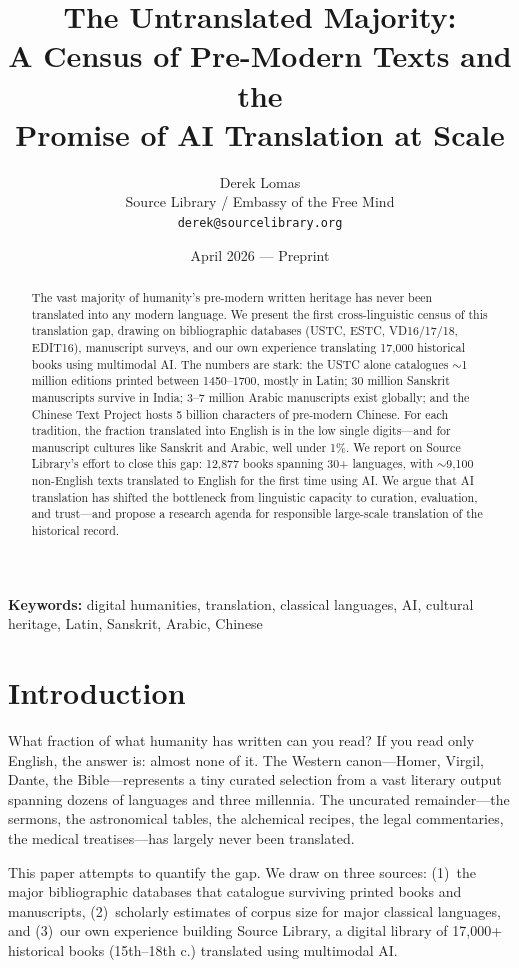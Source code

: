\documentclass[10pt,twocolumn]{article}
\title{\Large\bfseries The Untranslated Majority:\\[4pt] A Census of Pre-Modern Texts and the\\Promise of AI Translation at Scale}
\author{Derek Lomas\\
\small Source Library / Embassy of the Free Mind\\
\small \texttt{derek@sourcelibrary.org}}
\date{April 2026 --- Preprint}
\newcommand{\keywords}[1]{\par\smallskip\noindent\textbf{Keywords:} #1}
\begin{document}
\maketitle
\thispagestyle{empty}

\begin{abstract}
\noindent The vast majority of humanity's pre-modern written heritage has never been translated into any modern language. We present the first cross-linguistic census of this translation gap, drawing on bibliographic databases (USTC, ESTC, VD16/17/18, EDIT16), manuscript surveys, and our own experience translating 17,000 historical books using multimodal AI. The numbers are stark: the USTC alone catalogues ${\sim}$1 million editions printed between 1450--1700, mostly in Latin; 30 million Sanskrit manuscripts survive in India; 3--7 million Arabic manuscripts exist globally; and the Chinese Text Project hosts 5 billion characters of pre-modern Chinese. For each tradition, the fraction translated into English is in the low single digits---and for manuscript cultures like Sanskrit and Arabic, well under 1\%. We report on Source Library's effort to close this gap: 12,877 books spanning 30+ languages, with ${\sim}$9,100 non-English texts translated to English for the first time using AI. We argue that AI translation has shifted the bottleneck from linguistic capacity to curation, evaluation, and trust---and propose a research agenda for responsible large-scale translation of the historical record.
\end{abstract}

\keywords{digital humanities, translation, classical languages, AI, cultural heritage, Latin, Sanskrit, Arabic, Chinese}

\section{Introduction}

What fraction of what humanity has written can you read? If you read only English, the answer is: almost none of it. The Western canon---Homer, Virgil, Dante, the Bible---represents a tiny curated selection from a vast literary output spanning dozens of languages and three millennia. The uncurated remainder---the sermons, the astronomical tables, the alchemical recipes, the legal commentaries, the medical treatises---has largely never been translated.

This paper attempts to quantify the gap. We draw on three sources: (1)~the major bibliographic databases that catalogue surviving printed books and manuscripts, (2)~scholarly estimates of corpus size for major classical languages, and (3)~our own experience building Source Library, a digital library of 17,000+ historical books (15th--18th c.) translated using multimodal AI.
\end{document}
